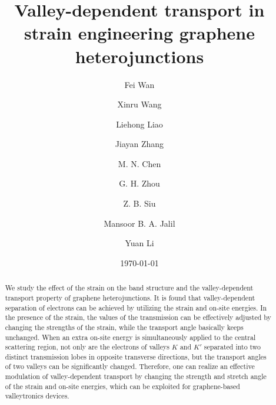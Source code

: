 \documentclass[reprint,amsmath,amssymb,aps,superscriptaddress]{revtex4-2}
\begin{document}
	
\title{Valley-dependent transport in strain engineering graphene heterojunctions}
	
\author{Fei Wan}
\author{Xinru Wang}
\author{Liehong Liao}
\author{Jiayan Zhang}
\author{M. N. Chen}
\author{G. H. Zhou}
\author{Z. B. Siu}
\author{Mansoor B. A. Jalil}
\author{Yuan Li}
	
\date{\today}
\begin{abstract}
We study the effect of the strain on the band structure and the valley-dependent transport property of graphene heterojunctions.
It is found that valley-dependent separation of electrons can be achieved by utilizing the strain and on-site energies. In the
presence of the strain, the values of the transmission can be effectively adjusted by changing the strengths of the strain, while the transport angle basically keeps unchanged. When an extra on-site energy is simultaneously applied to the central
scattering region, not only are the electrons of valleys $K$ and $K'$ separated into two distinct transmission lobes in opposite transverse directions, but the transport angles of two valleys can be significantly changed. Therefore, one can realize an effective modulation of valley-dependent transport by changing the strength and stretch angle of the strain and on-site energies, which can be exploited for graphene-based valleytronics devices.
\end{abstract}
\end{document}
